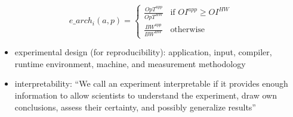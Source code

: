 \begin{definition}
    $$e\_arch_i(a, p) = 
    \begin{cases}
        \frac{OpT^{app}}{OpT^{HW}} & \text{if } OI^{app} \geq OI^{HW} \\
        \frac{BW^{app}}{BW^{HW}} & \text{otherwise}
    \end{cases}$$
    
\end{definition}

\newpage
\cite{hoefler_scientific_2015}

\begin{itemize}
    \item experimental design (for reproducibility): application, input, compiler, runtime environment, machine, and measurement methodology
    \item interpretability: \enquote{We call an experiment interpretable if it provides enough information to allow scientists to understand the experiment, draw own conclusions, assess their certainty, and possibly generalize results}
\end{itemize}

